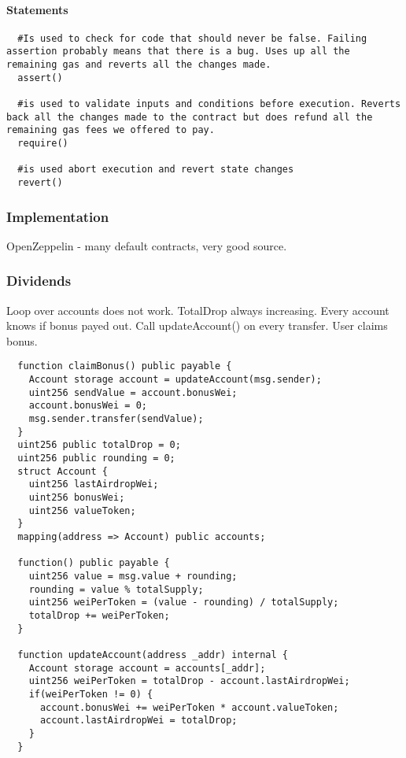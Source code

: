 \paragraph{Statements}
\begin{lstlisting}
  #Is used to check for code that should never be false. Failing assertion probably means that there is a bug. Uses up all the remaining gas and reverts all the changes made.
  assert()

  #is used to validate inputs and conditions before execution. Reverts back all the changes made to the contract but does refund all the remaining gas fees we offered to pay. 
  require()

  #is used abort execution and revert state changes
  revert()
\end{lstlisting}

\subsubsection{Implementation}
OpenZeppelin - many default contracts, very good source.

\subsubsection{Dividends}
Loop over accounts does not work. 
TotalDrop always increasing.
Every account knows if bonus payed out.
Call updateAccount() on every transfer.
User claims bonus.

\begin{lstlisting}
  function claimBonus() public payable {
    Account storage account = updateAccount(msg.sender);
    uint256 sendValue = account.bonusWei;
    account.bonusWei = 0;
    msg.sender.transfer(sendValue);
  }
  uint256 public totalDrop = 0;
  uint256 public rounding = 0;
  struct Account {
    uint256 lastAirdropWei;
    uint256 bonusWei;
    uint256 valueToken;
  }
  mapping(address => Account) public accounts;

  function() public payable {
    uint256 value = msg.value + rounding;
    rounding = value % totalSupply;
    uint256 weiPerToken = (value - rounding) / totalSupply;
    totalDrop += weiPerToken;
  }

  function updateAccount(address _addr) internal {
    Account storage account = accounts[_addr];
    uint256 weiPerToken = totalDrop - account.lastAirdropWei;
    if(weiPerToken != 0) {
      account.bonusWei += weiPerToken * account.valueToken;
      account.lastAirdropWei = totalDrop;
    }
  }
\end{lstlisting}

